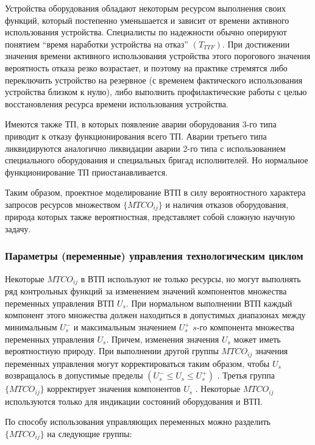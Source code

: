 Устройства оборудования обладают некоторым ресурсом выполнения своих функций, который постепенно уменьшается и зависит от времени активного использования устройства. Специалисты по надежности обычно оперируют понятием ``время наработки устройства на отказ'' $(T_{TTF})$. При достижении значения времени активного использования устройства этого порогового значения вероятность отказа резко возрастает, и поэтому на практике стремятся либо переключить устройство на резервное (с временем фактического использования устройства близком к нулю), либо выполнить профилактические работы с целью восстановления ресурса времени использования устройства.

Имеются также ТП, в которых появление аварии оборудования 3-го типа приводит к отказу функционирования всего ТП. Аварии третьего типа ликвидируются аналогично ликвидации аварии 2-го типа с использованием специального оборудования и специальных бригад исполнителей. Но нормальное функционирование ТП приостанавливается.

Таким образом, проектное моделирование ВТП в силу  вероятностного характера запросов ресурсов множеством $\big\{MTCO_{ij}\big\}$ и наличия отказов оборудования, природа которых также вероятностная, представляет собой сложную научную задачу.


\subsubsection{Параметры (переменные) управления технологическим циклом}

Некоторые $MTCO_{ij}$ в ВТП используют не только ресурсы, но могут выполнять ряд контрольных функций за изменением значений компонентов множества переменных управления ВТП ${U_s}$. При нормальном выполнении ВТП каждый компонент этого множества должен находиться в допустимых диапазонах между минимальным ${U_s^-}$ и максимальным значением ${U_s^+}$ $s$-го компонента множества переменных управления ${U_s}$. Причем, изменения значения $U_s$ может иметь вероятностную природу.
При выполнении другой группы $MTCO_{ij}$ значения переменных управления могут корректироваться таким образом, чтобы $U_s$ возвращалось в допустимые пределы $(U_s^- \leq U_s\leq U_s^+)$ . Третья группа $\big\{MTCO_{ij}\big\}$ корректирует значения компонентов ${U_s}$ . Некоторые $MTCO_{ij}$ используются только для индикации состояний оборудования и ВТП.

По способу использования управляющих переменных можно разделить $\big\{MTCO_{ij}\big\}$ на следующие группы:

